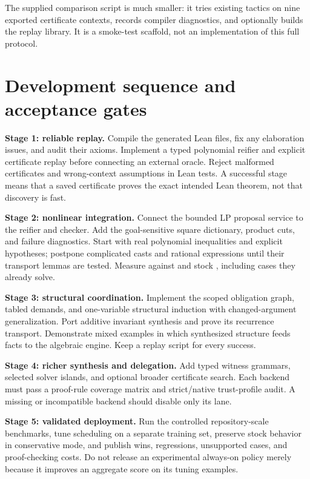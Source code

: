 The supplied comparison script is much smaller: it tries existing tactics on
nine exported certificate contexts, records compiler diagnostics, and optionally
builds the replay library. It is a smoke-test scaffold, not an implementation
of this full protocol.

\section{Development sequence and acceptance gates}

\textbf{Stage 1: reliable replay.} Compile the generated Lean files, fix any
elaboration issues, and audit their axioms. Implement a typed polynomial
reifier and explicit certificate replay before connecting an external oracle.
Reject malformed certificates and wrong-context assumptions in Lean tests.
A successful stage means that a saved certificate proves the exact intended
Lean theorem, not that discovery is fast.

\textbf{Stage 2: nonlinear integration.} Connect the bounded LP proposal service
to the reifier and checker. Add the goal-sensitive square dictionary, product
cuts, and failure diagnostics. Start with real polynomial inequalities and
explicit hypotheses; postpone complicated casts and rational expressions until
their transport lemmas are tested. Measure against  and stock
\grind, including cases they already solve.

\textbf{Stage 3: structural coordination.} Implement the scoped obligation graph,
tabled demands, and one-variable structural induction with changed-argument
generalization. Port additive invariant synthesis and prove its recurrence
transport. Demonstrate mixed examples in which synthesized structure feeds
facts to the algebraic engine. Keep a replay script for every success.

\textbf{Stage 4: richer synthesis and delegation.} Add typed witness grammars,
selected solver islands, and optional broader certificate search. Each backend
must pass a proof-rule coverage matrix and strict/native trust-profile audit.
A missing or incompatible backend should disable only its lane.

\textbf{Stage 5: validated deployment.} Run the controlled repository-scale
benchmarks, tune scheduling on a separate training set, preserve stock behavior
in conservative mode, and publish wins, regressions, unsupported cases, and
proof-checking costs. Do not release an experimental always-on policy merely
because it improves an aggregate score on its tuning examples.

